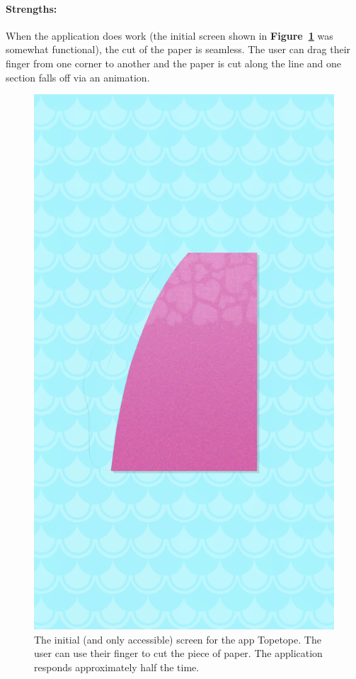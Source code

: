 \documentclass[11pt]{article}
\begin{document}
                \paragraph{Strengths:}
                When the application does work (the initial screen shown in \textbf{Figure~\ref{fig:topeReality}} was somewhat functional), the cut of the paper is seamless. The user can drag their finger from one corner to another and the paper is cut along the line and one section falls off via an animation.
                
                \begin{figure}[!ht]
                        \begin{minipage}{0.45\textwidth}
                            \centering
                            \includegraphics[width=0.6\linewidth]{Images/topeReality.png}
                            \captionsetup{margin = 0.5cm}
                            \caption{The initial (and only accessible) screen for the app Topetope. The user can use their finger to cut the piece of paper. The application responds approximately half the time. }
                            \label{fig:topeReality}
                        \end{minipage}
                        \begin{minipage}{0.48\textwidth}

\end{minipage}
\end{figure}
\end{document}
